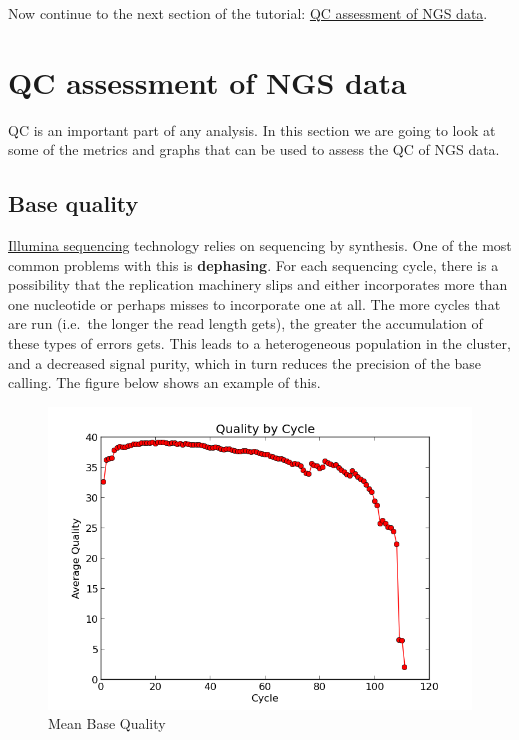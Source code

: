 \documentclass[11pt]{article}
\begin{document}
    Now continue to the next section of the tutorial:
\href{assessment.ipynb}{QC assessment of NGS data}.





\newpage





    \hypertarget{qc-assessment-of-ngs-data}{%
\section{QC assessment of NGS data}\label{qc-assessment-of-ngs-data}}

QC is an important part of any analysis. In this section we are going to
look at some of the metrics and graphs that can be used to assess the QC
of NGS data.

\hypertarget{base-quality}{%
\subsection{Base quality}\label{base-quality}}

\href{https://en.wikipedia.org/wiki/Illumina_dye_sequencing}{Illumina
sequencing} technology relies on sequencing by synthesis. One of the
most common problems with this is \textbf{dephasing}. For each
sequencing cycle, there is a possibility that the replication machinery
slips and either incorporates more than one nucleotide or perhaps misses
to incorporate one at all. The more cycles that are run (i.e.~the longer
the read length gets), the greater the accumulation of these types of
errors gets. This leads to a heterogeneous population in the cluster,
and a decreased signal purity, which in turn reduces the precision of
the base calling. The figure below shows an example of this.

    \begin{figure}[!h]
\centering
\includegraphics{img/base_qual.png}
\caption{Mean Base Quality}
\end{figure}
\end{document}
